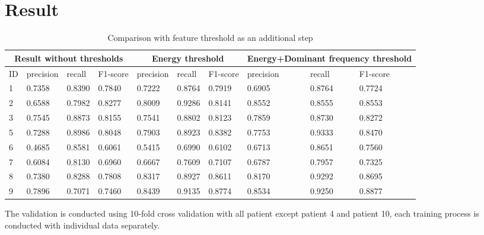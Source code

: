 \documentclass[article]{article}
\begin{document}
	
\section{Result}
 \begin{table}
	\begin{center}
		\begin{tabular}{  |p{0.5cm}||p{1.3cm}|p{1.3cm}|p{1.3cm}|p{1.3cm}|p{1.3cm}|p{1.3cm}|p{1.3cm}|p{1.3cm}|p{1.3cm}| }
			\hline
			\multicolumn{4}{|c|}{Result without thresholds} &\multicolumn{3}{|c|}{Energy threshold}&\multicolumn{3}{|c|}{Energy+Dominant frequency threshold}  \\
			\hline
			ID &  precision &  recall &  F1-score &  precision &  recall &  F1-score &  precision &  recall &  F1-score\\
			\hline
			1 & 0.7358 &0.8390 & 0.7840 & 0.7222 &0.8764 & 0.7919 & 0.6905 &0.8764 & 0.7724\\
			2 &0.6588 & 0.7982  & 0.8277 &0.8009 & 0.9286 & 0.8141 &  0.8552 &0.8555 & 0.8553\\ 
			
			3 & 0.7545 &0.8873 & 0.8155 & 0.7541 &0.8802 & 0.8123 &  0.7859 &0.8730 & 0.8272 \\   
			
			5   & 0.7288 &0.8986 & 0.8048  & 0.7903 &0.8923 & 0.8382 & 0.7753 &0.9333 & 0.8470\\
			
			6  & 0.4685 &0.8581 & \cellcolor{blue!25} 0.6061 & 0.5415 &0.6990 & 0.6102 & 0.6713 &0.8651 & \cellcolor{blue!25} 0.7560\\
			
			7& 0.6084 &0.8130 & 0.6960&  0.6667 &0.7609 & 0.7107  & 0.6787 &0.7957 & 0.7325 \\
			
			8  & 0.7380 &0.8288 & \cellcolor{blue!25} 0.7808 & 0.8317 &0.8927 & \cellcolor{blue!25} 0.8611 & 0.8170 &0.9292 & 0.8695  \\	
			
			9  & 0.7896 &0.7071 & \cellcolor{blue!25} 0.7460 & 0.8439 &0.9135 & \cellcolor{blue!25} 0.8774 & 0.8534 &0.9250 & 0.8877\\
			\hline
		\end{tabular}
		\caption{Comparison with feature threshold as an additional step}
		\label{thresholds}
	\end{center}
\end{table}
	The validation is conducted using 10-fold cross validation with all patient except patient 4 and patient 10, each training process is conducted with individual data separately. 
\end{document}
